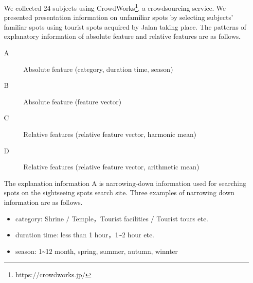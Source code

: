 \documentclass[journal]{IAENGtran}
\begin{document}
We collected 24 subjects using CrowdWorks\footnote{https://crowdworks.jp/}, a crowdsourcing service.
We presented presentation information on unfamiliar spots by selecting subjects' familiar spots using tourist spots acquired by Jalan taking place.
The patterns of explanatory information of absolute feature and relative features are as follows.
\begin{description}
\item[A]Absolute feature (category, duration time, season)
\item[B]Absolute feature (feature vector)
\item[C]Relative features (relative feature vector, harmonic mean)
\item[D]Relative features (relative feature vector, arithmetic mean)
\end{description}

The explanation information A is narrowing-down information used for searching spots on the sightseeing spots search site. Three examples of narrowing down information are as follows.

\begin{itemize}
\item category: Shrine / Temple，Tourist facilities / Tourist tours etc.
\item duration time: less than 1 hour，1\verb|~|2 hour etc.
\item season: 1\verb|~|12 month, spring, summer, autumn, winnter
\end{itemize}
\end{document}
